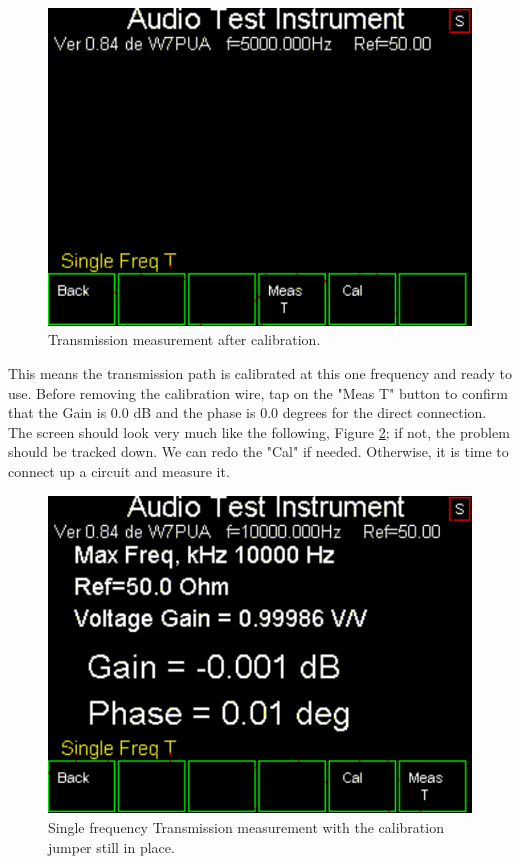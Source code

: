\begin{figure}[H]
\begin{center}
\includegraphics[scale=0.75]{./images/AVNA_044.pdf}
\caption{Transmission measurement after calibration.}
\label{AVNA_044-label}
\end{center}
\end{figure}
%
This means the transmission path is calibrated at this one frequency and ready to use.  Before removing the calibration wire, tap on the "\textsf{Meas T}" button to confirm that the Gain is 0.0 dB and the phase is 0.0 degrees for the direct connection.  The screen should look very much like the following, Figure \ref{AVNA_033-label}; if not, the problem should be tracked down.  We can redo the "\textsf{Cal}" if needed.  Otherwise, it is time to connect up a circuit and measure it.
\begin{figure}[H]
\begin{center}
\includegraphics[scale=0.75]{./images/AVNA_033.pdf}
\caption{Single frequency Transmission measurement with the calibration jumper still in place.}
\label{AVNA_033-label}
\end{center}
\end{figure}
